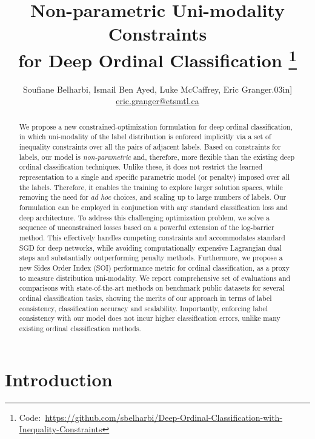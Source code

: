 \documentclass[8pt]{article}
\title{Non-parametric Uni-modality Constraints \\ for Deep Ordinal Classification
\thanks{Code:~\href{https://github.com/sbelharbi/Deep-Ordinal-Classification-with-Inequality-Constraints}{https://github.com/sbelharbi/Deep-Ordinal-Classification-with-Inequality-Constraints}}}
\author{Soufiane Belharbi, Ismail Ben Ayed, Luke McCaffrey, Eric Granger\0.03in]
{\footnotesize
\hspace{8.5mm} \href{mailto:eric.granger@etsmtl.ca}{eric.granger@etsmtl.ca}
}}
\theoremstyle{definition}
\begin{document}
\maketitle

\begin{abstract}
We propose a new constrained-optimization formulation for deep ordinal classification, in which uni-modality of the label distribution is enforced implicitly via a set of inequality constraints over all the pairs of adjacent labels. Based on  constraints for  labels, our model is {\em non-parametric} and, therefore, more flexible than the existing deep ordinal classification techniques. Unlike these, it does not restrict the learned representation to a single and specific parametric model (or penalty) imposed over all the labels. Therefore, it enables the training to explore larger solution spaces, while removing the need for {\em ad hoc} choices, and scaling up to large numbers of labels. Our formulation can be employed in conjunction with any standard classification loss and deep architecture.
To address this challenging optimization problem, we solve a sequence of unconstrained losses based on a powerful extension of the log-barrier method. This effectively handles competing constraints and accommodates standard SGD for deep networks, while avoiding computationally expensive Lagrangian dual steps and substantially  outperforming penalty methods. Furthermore, we propose a new Sides Order Index (SOI) performance metric for ordinal classification, as a proxy to measure distribution uni-modality. We report comprehensive set of evaluations and comparisons with state-of-the-art methods on benchmark public datasets for several ordinal classification tasks, showing the merits of our approach in terms of label consistency, classification accuracy and scalability. Importantly, enforcing label consistency with our model does not incur higher classification errors, unlike many existing ordinal classification methods.
\end{abstract}


\section{Introduction}
\label{sec:introduction}
\end{document}

